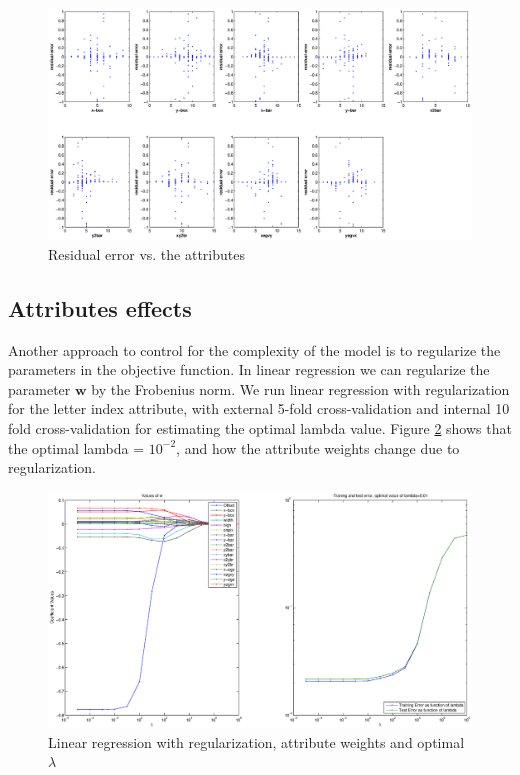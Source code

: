 \begin{figure}[htbp]
\center
\includegraphics[width = 1.1\textwidth]{figures/r3}
\caption{Residual error vs. the attributes}
\label{fig:r3}
\end{figure}

\subsection{Attributes effects}
Another approach to control for the complexity of the model is to regularize the parameters in the objective function. In linear regression we can regularize the parameter $\textbf{w}$ by the Frobenius norm. 
We run linear regression with regularization for the letter index attribute, with external 5-fold cross-validation and internal 10 fold cross-validation for estimating the optimal lambda value. Figure \ref{fig:r5} shows that the optimal lambda = $10^{-2}$, and how the attribute weights change due to regularization.

\begin{figure}[htbp]
\center
\includegraphics[width = 1.25\textwidth]{figures/r5}
\caption{Linear regression with regularization,  attribute weights and optimal $\lambda$}
\label{fig:r5}
\end{figure}

